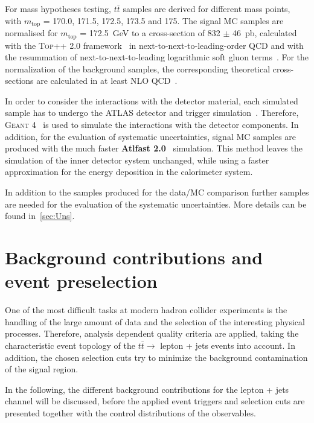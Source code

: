  For mass hypotheses testing, $t\bar{t}$ samples are derived for different mass points, with $m_{\text{top}}$ = 170.0, 171.5, 172.5, 173.5 and 175. The signal MC samples are normalised for $m_{\text{top}}$ = 172.5~GeV to a cross-section of 832 $\pm$ 46~pb, calculated with the \textsc{Top++ 2.0} framework~\cite{Czakon:2011xx} in next-to-next-to-leading-order QCD and with 
the resummation of next-to-next-to-leading logarithmic soft gluon terms~\cite{Cacciari:2011hy,Beneke:2011mq,Baernreuther:2012ws,Czakon:2012zr,Czakon:2013goa}.  For the normalization of the background samples, the corresponding  theoretical cross-sections are calculated in at least NLO  QCD~\cite{Catani:2009sm,Kidonakis:2010tc,Kidonakis:2010ux,Kidonakis:2011wy,Campbell:1999ah,Campbell:2011bn,Alwall:2014hca,deFlorian:2016spz,ATL-PHYS-PUB-2016-003}. 
 



 In order to consider the  interactions with the detector material, each simulated sample has to undergo the ATLAS detector and trigger simulation~\cite{Aad:2010ah}. Therefore, \textsc{Geant 4}~\cite{Agostinelli:2002hh}  is used to simulate the interactions with the detector components.  In addition, for the evaluation of systematic uncertainties, signal MC samples are produced with the much faster \textbf{Atlfast 2.0}~\cite{Richter-Was:683751} simulation. This method leaves the simulation of the inner detector system unchanged, while using a faster approximation for the energy deposition in the calorimeter system.

 In addition to the samples produced for the data/MC comparison further samples are needed for the evaluation of the systematic uncertainties. More details can be found in~\cref{sec:Uns}. 



\section{Background contributions and  event preselection}\label{selection}
 One of the most difficult tasks at modern hadron collider experiments is the handling of the large amount of data and the selection of the interesting physical processes. Therefore, analysis dependent quality criteria are applied, taking the characteristic event topology of the  $t\bar{t}\rightarrow$ lepton + jets events into account. In addition, the chosen selection cuts try to minimize the background contamination of the signal region. 
 
  In the following, the different background contributions for the lepton + jets channel will be discussed, before the applied event triggers and selection cuts are presented together with the control distributions of the observables.
  

